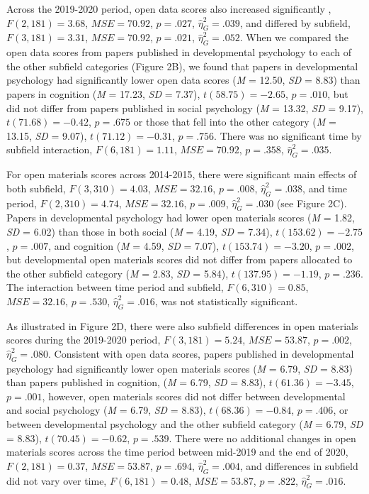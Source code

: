\documentclass[
  english,
  man,floatsintext]{apa6}
\begin{document}
Across the 2019-2020 period, open data scores also increased significantly , \(F(2, 181) = 3.68\), \(\mathit{MSE} = 70.92\), \(p = .027\), \(\hat{\eta}^2_G = .039\), and differed by subfield, \(F(3, 181) = 3.31\), \(\mathit{MSE} = 70.92\), \(p = .021\), \(\hat{\eta}^2_G = .052\). When we compared the open data scores from papers published in developmental psychology to each of the other subfield categories (Figure 2B), we found that papers in developmental psychology had significantly lower open data scores (\emph{M} = 12.50, \emph{SD} = 8.83) than papers in cognition (\emph{M} = 17.23, \emph{SD} = 7.37), \(t(58.75) = -2.65\), \(p = .010\), but did not differ from papers published in social psychology (\emph{M} = 13.32, \emph{SD} = 9.17), \(t(71.68) = -0.42\), \(p = .675\) or those that fell into the other category (\emph{M} = 13.15, \emph{SD} = 9.07), \(t(71.12) = -0.31\), \(p = .756\). There was no significant time by subfield interaction, \(F(6, 181) = 1.11\), \(\mathit{MSE} = 70.92\), \(p = .358\), \(\hat{\eta}^2_G = .035\).

For open materials scores across 2014-2015, there were significant main effects of both subfield, \(F(3, 310) = 4.03\), \(\mathit{MSE} = 32.16\), \(p = .008\), \(\hat{\eta}^2_G = .038\), and time period, \(F(2, 310) = 4.74\), \(\mathit{MSE} = 32.16\), \(p = .009\), \(\hat{\eta}^2_G = .030\) (see Figure 2C). Papers in developmental psychology had lower open materials scores (\emph{M} = 1.82, \emph{SD} = 6.02) than those in both social (\emph{M} = 4.19, \emph{SD} = 7.34), \(t(153.62) = -2.75\), \(p = .007\), and cognition (\emph{M} = 4.59, \emph{SD} = 7.07), \(t(153.74) = -3.20\), \(p = .002\), but developmental open materials scores did not differ from papers allocated to the other subfield category (\emph{M} = 2.83, \emph{SD} = 5.84), \(t(137.95) = -1.19\), \(p = .236\). The interaction between time period and subfield, \(F(6, 310) = 0.85\), \(\mathit{MSE} = 32.16\), \(p = .530\), \(\hat{\eta}^2_G = .016\), was not statistically significant.

As illustrated in Figure 2D, there were also subfield differences in open materials scores during the 2019-2020 period, \(F(3, 181) = 5.24\), \(\mathit{MSE} = 53.87\), \(p = .002\), \(\hat{\eta}^2_G = .080\). Consistent with open data scores, papers published in developmental psychology had significantly lower open materials scores (\emph{M} = 6.79, \emph{SD} = 8.83) than papers published in cognition, (\emph{M} = 6.79, \emph{SD} = 8.83), \(t(61.36) = -3.45\), \(p = .001\), however, open materials scores did not differ between developmental and social psychology (\emph{M} = 6.79, \emph{SD} = 8.83), \(t(68.36) = -0.84\), \(p = .406\), or between developmental psychology and the other subfield category (\emph{M} = 6.79, \emph{SD} = 8.83), \(t(70.45) = -0.62\), \(p = .539\). There were no additional changes in open materials scores across the time period between mid-2019 and the end of 2020, \(F(2, 181) = 0.37\), \(\mathit{MSE} = 53.87\), \(p = .694\), \(\hat{\eta}^2_G = .004\), and differences in subfield did not vary over time, \(F(6, 181) = 0.48\), \(\mathit{MSE} = 53.87\), \(p = .822\), \(\hat{\eta}^2_G = .016\).
\end{document}
